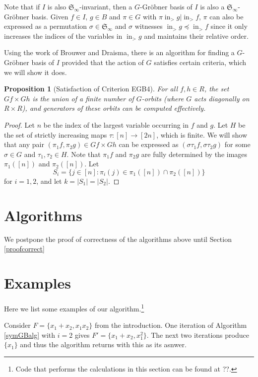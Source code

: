 \documentclass{amsart}
\newtheorem{proposition}[theorem]{Proposition}
\theoremstyle{definition}
\theoremstyle{remark}
\numberwithin{equation}{section}
\newcommand{\<}{\langle}
\renewcommand{\>}{\rangle}
\newcommand{\LT}{\operatorname{in}_>}
\begin{document}
Note that if $I$ is also ${\mathfrak S}_\infty$-invariant, then a $G$-Gr\"obner basis of $I$ is also a ${\mathfrak S}_\infty$-Gr\"obner basis.  Given $f \in I$, $g \in B$ and $\pi \in G$ with $\pi \LT{g}|\LT{f}$, $\pi$ can also be expressed as a permutation $\sigma \in {\mathfrak S}_\infty$ and $\sigma$ witnesses $\LT{g} \preceq \LT{f}$ since it only increases the indices of the variables in $\LT{g}$ and maintains their relative order.

Using the work of Brouwer and Draisma, there is an algorithm for finding a $G$-Gr\"obner basis of $I$ provided that the action of $G$ satisfies certain criteria, which we will show it does.
\begin{proposition}[Satisfaction of Criterion EGB4]
 For all $f,h \in R$, the set $Gf \times Gh$ is the union of a finite number of $G$-orbits (where $G$ acts diagonally on $R \times R$), and generators of these orbits can be computed effectively.
\end{proposition}
\begin{proof}
 Let $n$ be the index of the largest variable occurring in $f$ and $g$.  Let $H$ be the set of strictly increasing maps $\tau:[n] \to [2n]$, which is finite.  We will show that any pair $(\pi_1 f, \pi_2 g) \in Gf \times Gh$ can be expressed as $(\sigma \tau_1 f, \sigma \tau_2 g)$ for some $\sigma \in G$ and $\tau_1,\tau_2 \in H$.  Note that $\pi_1 f$ and $\pi_2 g$ are fully determined by the images $\pi_1([n])$ and $\pi_2([n])$.  Let
 \[ S_i = \{j \in [n]: \pi_i(j) \in \pi_1([n]) \cap \pi_2([n])\} \]
 for $i = 1,2$, and let $k = |S_1| = |S_2|$.
\end{proof}




\section{Algorithms}

We postpone the proof of correctness of the algorithms above until Section \ref{proofcorrect}

\section{Examples}\label{algexamples}

Here we list some examples of our algorithm.\footnote{Code that performs the calculations in this section can be found at ??.}

Consider $F = \{x_1+x_2, x_1 x_2\}$ from the introduction.  One iteration of 
Algorithm \ref{symGBalg} with $i = 2$ gives $F' = \{x_1+x_2, x_1^2\}$.
The next two iterations produce $\{x_1\}$ and thus the algorithm returns with this 
as its asnwer. 
\end{document}
